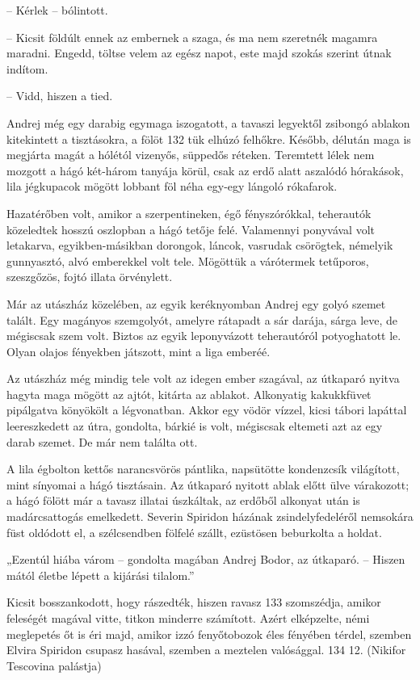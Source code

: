 \documentclass{IEEEtran}
\begin{document}
– Kérlek – bólintott.

– Kicsit földúlt ennek az embernek a szaga, és ma nem szeretnék magamra
maradni. Engedd, töltse velem az egész napot, este majd szokás szerint útnak
indítom.

– Vidd, hiszen a tied.

Andrej még egy darabig egymaga iszogatott, a tavaszi legyektől zsibongó
ablakon kitekintett a tisztásokra, a fölöt 132 tük elhúzó felhőkre. Később,
délután maga is megjárta magát a hólétól vizenyős, süppedős réteken. Teremtett
lélek nem mozgott a hágó két-három tanyája körül, csak az erdő alatt aszalódó
hórakások, lila jégkupacok mögött lobbant föl néha egy-egy lángoló rókafarok.

Hazatérőben volt, amikor a szerpentineken, égő fényszórókkal, teherautók
közeledtek hosszú oszlopban a hágó tetője felé. Valamennyi ponyvával volt
letakarva, egyikben-másikban dorongok, láncok, vasrudak csörögtek, némelyik
gunnyasztó, alvó emberekkel volt tele. Mögöttük a várótermek tetűporos,
szeszgőzös, fojtó illata örvénylett.

Már az utászház közelében, az egyik keréknyomban Andrej egy golyó szemet
talált. Egy magányos szemgolyót, amelyre rátapadt a sár darája, sárga leve, de
mégiscsak szem volt. Biztos az egyik leponyvázott teherautóról potyoghatott
le. Olyan olajos fényekben játszott, mint a liga emberéé.

Az utászház még mindig tele volt az idegen ember szagával, az útkaparó nyitva
hagyta maga mögött az ajtót, kitárta az ablakot. Alkonyatig kakukkfüvet
pipálgatva könyökölt a légvonatban. Akkor egy vödör vízzel, kicsi tábori
lapáttal leereszkedett az útra, gondolta, bárkié is volt, mégiscsak eltemeti
azt az egy darab szemet. De már nem találta ott.

A lila égbolton kettős narancsvörös pántlika, napsütötte kondenzcsík
világított, mint sínyomai a hágó tisztásain. Az útkaparó nyitott ablak előtt
ülve várakozott; a hágó fölött már a tavasz illatai úszkáltak, az erdőből
alkonyat után is madárcsattogás emelkedett. Severin Spiridon házának
zsindelyfedeléről nemsokára füst oldódott el, a szélcsendben fölfelé szállt,
ezüstösen beburkolta a holdat.

„Ezentúl hiába várom – gondolta magában Andrej Bodor, az útkaparó. – Hiszen
mától életbe lépett a kijárási tilalom.”

Kicsit bosszankodott, hogy rászedték, hiszen ravasz 133 szomszédja, amikor
feleségét magával vitte, titkon minderre számított. Azért elképzelte, némi
meglepetés őt is éri majd, amikor izzó fenyőtobozok éles fényében térdel,
szemben Elvira Spiridon csupasz hasával, szemben a meztelen valósággal.
134
12. (Nikifor Tescovina palástja)
\end{document}
